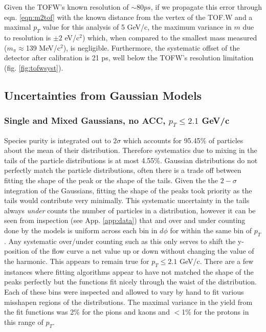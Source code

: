 Given the TOFW's known resolution of $\sim 80 ps$, if we propagate this error through eqn. \ref{eqn:m2tof} with the known distance from the vertex of the TOF.W and a maximal $p_T$ value for this analysis of 5 GeV/c, the maximum variance in $m$ due to resolution is $\pm 2$ eV/c$^2$) which, when compared to the smallest mass measured ($m_{\pi}\approx$139 MeV/c$^2$), is negligible. Furthermore, the systematic offset of the detector after calibration is 21 ps, well below the TOFW's resolution limitation (fig. \ref{fig:tofwsyst}).

\subsection{Uncertainties from Gaussian Models}
\subsubsection{Single and Mixed Gaussians, no ACC, $p_T\leq2.1$ GeV/c}
Species purity is integrated out to $2\sigma$ which accounts for 95.45\% of particles about the mean of their distribution. Therefore systematics due to mixing in the tails of the particle distributions is at most 4.55\%. Gaussian distributions do not perfectly match the particle distributions, often there is a trade off between fitting the shape of the peak or the shape of the tails. Given the the $2-\sigma$ integration of the Gaussians, fitting the shape of the peaks took priority as the tails would contribute very minimally. This systematic uncertainty in the tails always \textit{under} counts the number of particles in a distribution, however it can be seen from inspection (see App. \ref{app:data}) that and over and under counting done by the models is uniform across each bin in $d\phi$ for within the same bin of $p_T$. Any systematic over/under counting such as this only serves to shift the y-position of the flow curve a net value up or down without changing the value of the harmonic. This appears to remain true for $p_T \leq 2.1$ GeV/c. There are a few instances where fitting algorithms appear to have not matched the shape of the peaks perfectly but the functions fit nicely through the waist of the distribution. Each of these bins were inspected and allowed to vary by hand to fit various misshapen regions of the distributions. The maximal variance in the yield from the fit functions was 2\% for the pions and kaons and $<$1\% for the protons in this range of $p_T$.

